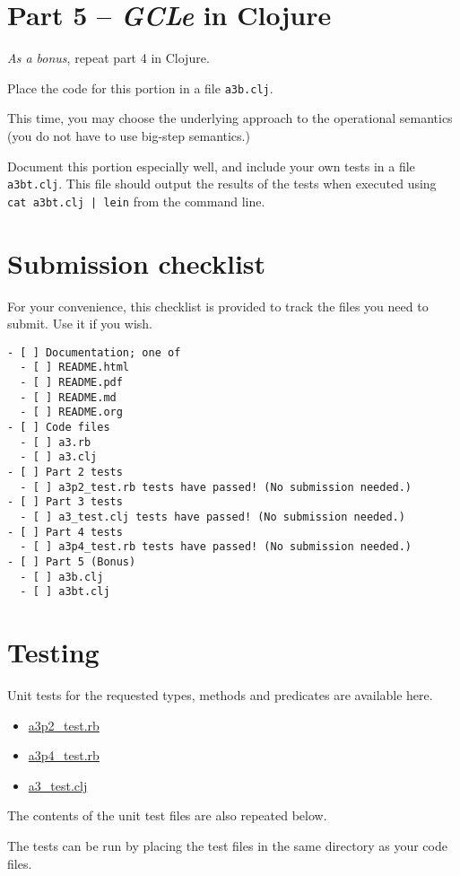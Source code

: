 \documentclass[11pt]{article}
\theoremstyle{definition}
\begin{document}
\section*{Part 5 – \emph{GCLe} in Clojure}
\label{sec:org2d79150}
\emph{As a bonus}, repeat part 4 in Clojure.

Place the code for this portion in a file \texttt{a3b.clj}.

This time, you may choose the underlying approach to the operational semantics
(you do not have to use big-step semantics.)

Document this portion especially well, and include your own
tests in a file \texttt{a3bt.clj}. This file should output the results of the tests
when executed using \texttt{cat a3bt.clj | lein} from the command line.

\section*{Submission checklist}
\label{sec:org796d742}
For your convenience, this checklist is provided
to track the files you need to submit.
Use it if you wish.
\begin{verbatim}
- [ ] Documentation; one of
  - [ ] README.html
  - [ ] README.pdf
  - [ ] README.md
  - [ ] README.org
- [ ] Code files
  - [ ] a3.rb
  - [ ] a3.clj
- [ ] Part 2 tests
  - [ ] a3p2_test.rb tests have passed! (No submission needed.)
- [ ] Part 3 tests
  - [ ] a3_test.clj tests have passed! (No submission needed.)
- [ ] Part 4 tests
  - [ ] a3p4_test.rb tests have passed! (No submission needed.)
- [ ] Part 5 (Bonus)
  - [ ] a3b.clj
  - [ ] a3bt.clj
\end{verbatim}

\section*{Testing}
\label{sec:orgfb1ce77}
Unit tests for the requested types, methods and predicates
are available here.
\begin{itemize}
\item \href{./testing/a3/a3p2\_test.rb}{a3p2\_test.rb}
\item \href{./testing/a3/a3p4\_test.rb}{a3p4\_test.rb}
\item \href{./testing/a3/a3\_test.clj}{a3\_test.clj}
\end{itemize}
The contents of the unit test files are also repeated below.

The tests can be run by placing the test files
in the same directory as your code files.
\end{document}
